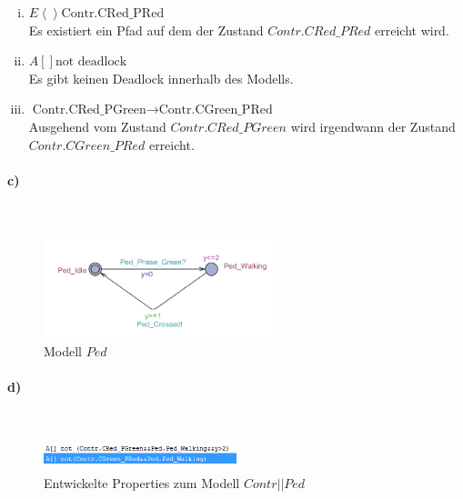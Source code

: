 \begin{enumerate}[i)]

	\item $E \left<\right> \text{Contr.CRed\_PRed} $\\
	Es existiert ein Pfad auf dem der Zustand $Contr.CRed\_PRed$ erreicht wird.
	
	\item $A[] \text{not deadlock}$ \\
	Es gibt keinen Deadlock innerhalb des Modells.
	
	\item $\text{Contr.CRed\_PGreen} \rightarrow  \text{Contr.CGreen\_PRed}$ \\
	Ausgehend vom Zustand $Contr.CRed\_PGreen$ wird irgendwann der Zustand $Contr.CGreen\_PRed$ erreicht.
	
\end{enumerate}

\paragraph{c)}\mbox{} \\

\begin{figure}[H] 
	\centering 
	\includegraphics[width=0.6\textwidth]{./UPAAAL_Screens/Pedestrian}
	\caption[Aufgabe 2c)]{Modell $Ped$}    
\end{figure}

\paragraph{d)}\mbox{} \\

\begin{figure}[H] 
	\centering 
	\includegraphics[width=0.5\textwidth]{./UPAAAL_Screens/2d_Verifyer}
	\caption[Aufgabe 2d)]{Entwickelte Properties zum Modell $Contr||Ped$}    
\end{figure}


